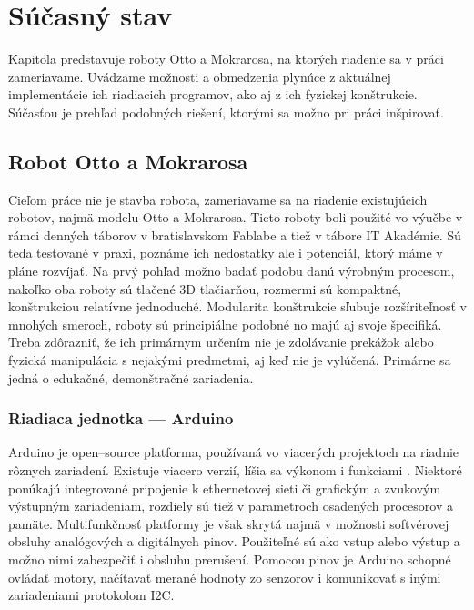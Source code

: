 \chapter{Súčasný stav}

\label{kap:vychodisko}

Kapitola predstavuje roboty Otto a Mokrarosa, na ktorých riadenie sa v práci zameriavame. Uvádzame možnosti a obmedzenia plynúce z aktuálnej implementácie ich riadiacich programov, ako aj z ich fyzickej konštrukcie. Súčasťou je prehľad podobných riešení, ktorými sa možno pri práci inšpirovať.

\section{Robot Otto a Mokrarosa}
\label{sec:OttoMokrarosa}
Cieľom práce nie je stavba robota, zameriavame sa na riadenie existujúcich robotov, najmä modelu Otto a Mokrarosa. Tieto roboty boli použité vo výučbe v rámci denných táborov v bratislavskom Fablabe a tiež v tábore IT Akadémie. Sú teda testované v praxi, poznáme ich nedostatky ale i potenciál, ktorý máme v pláne rozvíjať. Na prvý pohľad možno badať podobu danú výrobným procesom, nakoľko oba roboty sú tlačené 3D tlačiarňou, rozmermi sú kompaktné, konštrukciou relatívne jednoduché. Modularita konštrukcie sľubuje rozšíriteľnosť v mnohých smeroch, roboty sú principiálne podobné no majú aj svoje špecifiká. Treba zdôrazniť, že ich primárnym určením nie je zdolávanie prekážok alebo fyzická manipulácia s nejakými predmetmi, aj keď nie je vylúčená. Primárne sa jedná o edukačné, demonštračné zariadenia.

\subsection{Riadiaca jednotka --- Arduino}
Arduino je open--source platforma, používaná vo viacerých projektoch na riadnie rôznych zariadení. Existuje viacero verzií, líšia sa výkonom i funkciami \cite{ArduinoConcept}. Niektoré ponúkajú integrované pripojenie k ethernetovej sieti či grafickým a zvukovým výstupným zariadeniam, rozdiely sú tiež v parametroch osadených procesorov a pamäte. Multifunkčnosť platformy je však skrytá najmä v možnosti softvérovej obsluhy analógových a digitálnych pinov. Použiteľné sú ako vstup alebo výstup a možno nimi zabezpečiť i obsluhu prerušení. Pomocou pinov je Arduino schopné ovládať motory, načítavať merané hodnoty zo senzorov i komunikovať s inými zariadeniami protokolom I2C.

